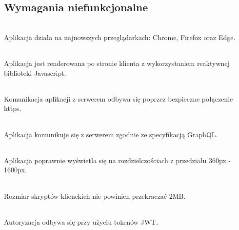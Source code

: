 \subsection{Wymagania niefunkcjonalne}
\begin{description}[leftmargin={15pt},labelindent={0pt}]
  \item[WN1.] \hfill \\ Aplikacja działa na najnowszych przeglądarkach: Chrome, Firefox oraz Edge.
  \item[WN2.] \hfill \\ Aplikacja jest renderowana po stronie klienta z wykorzystaniem reaktywnej biblioteki Javascript.
  \item[WN3.] \hfill \\ Komunikacja aplikacji z serwerem odbywa się poprzez bezpieczne połączenie https.
  \item[WN4.] \hfill \\ Aplikacja komunikuje się z serwerem zgodnie ze specyfikacją GraphQL.
  \item[WN5.] \hfill \\ Aplikacja poprawnie wyświetla się na rozdzielczościach z przedziału 360px - 1600px.
  \item[WN5.] \hfill \\ Rozmiar skryptów klienckich nie powinien przekraczać 2MB.
  \item[WN6.] \hfill \\ Autoryzacja odbywa się przy użyciu tokenów JWT.
\end{description}
